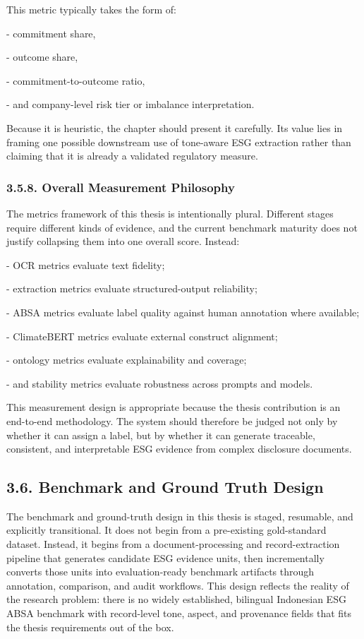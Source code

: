 \documentclass{article}
\begin{document}
This metric typically takes the form of:

- commitment share,

- outcome share,

- commitment-to-outcome ratio,

- and company-level risk tier or imbalance interpretation.

Because it is heuristic, the chapter should present it carefully. Its value lies in framing one possible downstream use of tone-aware ESG extraction rather than claiming that it is already a validated regulatory measure.
\subsubsection*{3.5.8. Overall Measurement Philosophy}

The metrics framework of this thesis is intentionally plural. Different stages require different kinds of evidence, and the current benchmark maturity does not justify collapsing them into one overall score. Instead:

- OCR metrics evaluate text fidelity;

- extraction metrics evaluate structured-output reliability;

- ABSA metrics evaluate label quality against human annotation where available;

- ClimateBERT metrics evaluate external construct alignment;

- ontology metrics evaluate explainability and coverage;

- and stability metrics evaluate robustness across prompts and models.

This measurement design is appropriate because the thesis contribution is an end-to-end methodology. The system should therefore be judged not only by whether it can assign a label, but by whether it can generate traceable, consistent, and interpretable ESG evidence from complex disclosure documents.
\subsection*{ 3.6. Benchmark and Ground Truth Design}

The benchmark and ground-truth design in this thesis is staged, resumable, and explicitly transitional. It does not begin from a pre-existing gold-standard dataset. Instead, it begins from a document-processing and record-extraction pipeline that generates candidate ESG evidence units, then incrementally converts those units into evaluation-ready benchmark artifacts through annotation, comparison, and audit workflows. This design reflects the reality of the research problem: there is no widely established, bilingual Indonesian ESG ABSA benchmark with record-level tone, aspect, and provenance fields that fits the thesis requirements out of the box.
\end{document}
